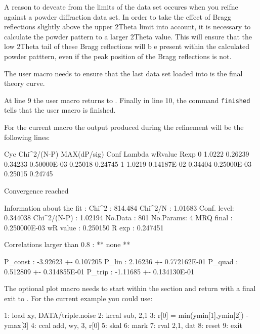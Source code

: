 A reason to deveate from the limits of the data set occures when you reifne 
against a powder diffraction data set. In order to take the effect of Bragg 
reflections slightly above the upper 2Theta limit into account, it is necessary
to calculate the powder pattern to a larger 2Theta value. This will ensure that 
the low 2Theta tail of these Bragg reflections will b e present within the 
calculated powder patttern, even if the peak position of the Bragg reflections
is not.

The user macro needs to ensure that the last data set loaded into \Kuplot is 
the final theory curve. 

At line 9 the user macro returns to \Refine. Finally in line 10, the 
\Refine command {\tt finished} tells \Refine that the user macro is finished.

For the current macro the output produced during the refinement will be the
following lines:

\begin{MacVerbatim}
Cyc Chi^2/(N-P)   MAX(dP/sig)   Conf          Lambda       wRvalue      Rexp
  0   1.0222      0.26239      0.34233      0.50000E-03  0.25018      0.24745    
  1   1.0219      0.14187E-02  0.34404      0.25000E-03  0.25015      0.24745    

Convergence reached 

 Information about the fit : 
   Chi^2      :  814.484          Chi^2/N :  1.01683    
   Conf. level: 0.344038      Chi^2/(N-P) :  1.02194    
   No.Data    :          801     No.Params:            4
   MRQ final  : 0.250000E-03
   wR value   : 0.250150          R exp   : 0.247451    

 Correlations larger than 0.8 :
   ** none **
  
   P_const          :   -3.92623      +-    0.107205    
   P_lin            :    2.16236      +-    0.772162E-01
   P_quad           :   0.512809      +-    0.314855E-01
   P_trip           :   -1.11685      +-    0.134130E-01
\end{MacVerbatim}

The optional plot macro needs to start within the \Kuplot section and return
with a final exit to . For the current example you could use:

\begin{MacVerbatim}
 1: load xy, DATA/triple.noise
 2: kccal sub, 2,1
 3: r[0] = min(ymin[1],ymin[2]) - ymax[3]
 4: ccal add, wy, 3, r[0]
 5: skal
 6: mark
 7: rval 2,1, dat
 8: reset
 9: exit
\end{MacVerbatim}


